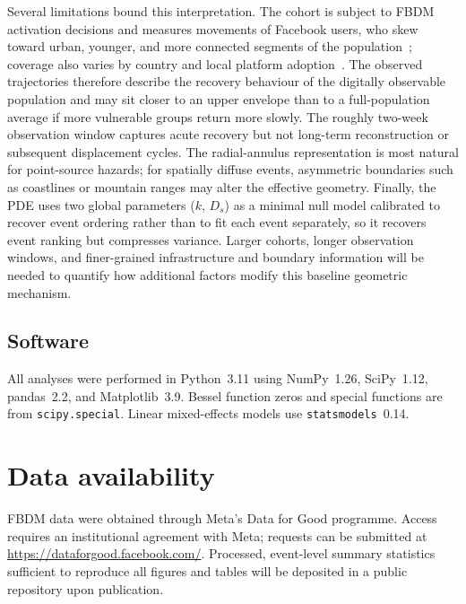 \documentclass[11pt]{article}
\newcommand{\Ds}{D_s}
\begin{document}
Several limitations bound this interpretation. The cohort is subject to FBDM activation decisions and measures movements of Facebook users, who skew toward urban, younger, and more connected segments of the population~\citep{Chin2025,Gallotti2024}; coverage also varies by country and local platform adoption~\citep{Huang2025}. The observed trajectories therefore describe the recovery behaviour of the digitally observable population and may sit closer to an upper envelope than to a full-population average if more vulnerable groups return more slowly. The roughly two-week observation window captures acute recovery but not long-term reconstruction or subsequent displacement cycles. The radial-annulus representation is most natural for point-source hazards; for spatially diffuse events, asymmetric boundaries such as coastlines or mountain ranges may alter the effective geometry. Finally, the PDE uses two global parameters ($k$, $\Ds$) as a minimal null model calibrated to recover event ordering rather than to fit each event separately, so it recovers event ranking but compresses variance. Larger cohorts, longer observation windows, and finer-grained infrastructure and boundary information will be needed to quantify how additional factors modify this baseline geometric mechanism.


\FloatBarrier


\subsection*{Software}

All analyses were performed in Python~3.11 using NumPy~1.26,
SciPy~1.12, pandas~2.2, and Matplotlib~3.9.  Bessel function
zeros and special functions are from \texttt{scipy.special}.
Linear mixed-effects models use \texttt{statsmodels}~0.14.


\section*{Data availability}
FBDM data were obtained through Meta's Data for
Good programme.  Access requires an institutional agreement with
Meta; requests can be submitted at
\url{https://dataforgood.facebook.com/}.  Processed, event-level
summary statistics sufficient to reproduce all figures and tables
will be deposited in a public repository upon publication.
\end{document}
